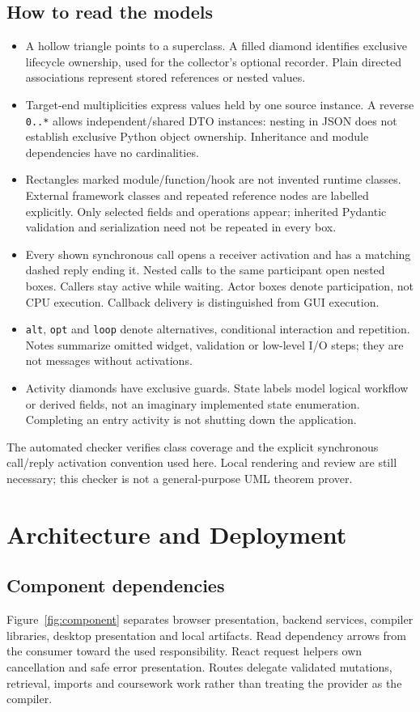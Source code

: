 \documentclass[11pt,a4paper]{article}
\begin{document}
\subsection{How to read the models}
\begin{itemize}
\item A hollow triangle points to a superclass. A filled diamond identifies
exclusive lifecycle ownership, used for the collector's optional recorder.
Plain directed associations represent stored references or nested values.
\item Target-end multiplicities express values held by one source instance.
A reverse \texttt{0..*} allows independent/shared DTO instances: nesting in
JSON does not establish exclusive Python object ownership. Inheritance and
module dependencies have no cardinalities.
\item Rectangles marked module/function/hook are not invented runtime classes.
External framework classes and repeated reference nodes are labelled explicitly.
Only selected fields and operations appear; inherited Pydantic validation and
serialization need not be repeated in every box.
\item Every shown synchronous call opens a receiver activation and has a
matching dashed reply ending it. Nested calls to the same participant open
nested boxes. Callers stay active while waiting. Actor boxes denote participation,
not CPU execution. Callback delivery is distinguished from GUI execution.
\item \texttt{alt}, \texttt{opt} and \texttt{loop} denote alternatives,
conditional interaction and repetition. Notes summarize omitted widget,
validation or low-level I/O steps; they are not messages without activations.
\item Activity diamonds have exclusive guards. State labels model logical
workflow or derived fields, not an imaginary implemented state enumeration.
Completing an entry activity is not shutting down the application.
\end{itemize}
The automated checker verifies class coverage and the explicit synchronous
call/reply activation convention used here. Local rendering and review are
still necessary; this checker is not a general-purpose UML theorem prover.

\section{Architecture and Deployment}
\subsection{Component dependencies}
Figure~\ref{fig:component} separates browser presentation, backend services,
compiler libraries, desktop presentation and local artifacts. Read dependency
arrows from the consumer toward the used responsibility. React request helpers
own cancellation and safe error presentation. Routes delegate validated
mutations, retrieval, imports and coursework work rather than treating the
provider as the compiler.
\end{document}

